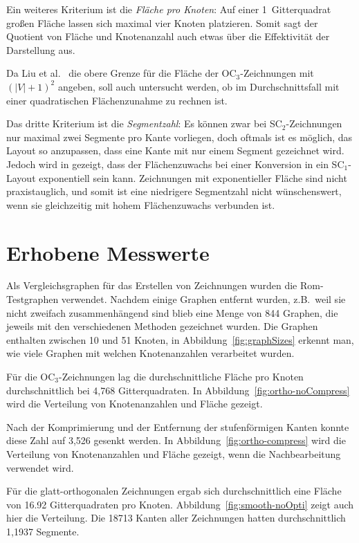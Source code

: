\documentclass[a4paper]{scrreprt}
\theoremstyle{definition}
\begin{document}
Ein weiteres Kriterium ist die \emph{Fläche pro Knoten}: Auf einer 1~Gitterquadrat großen Fläche lassen sich maximal vier Knoten platzieren. Somit sagt der Quotient von Fläche und Knotenanzahl auch etwas über die Effektivität der Darstellung aus.

Da Liu et al.~\cite{liu+etal-98} die obere Grenze für die Fläche der OC$_3$-Zeichnungen mit $(|V|+1)^2$ angeben, soll auch untersucht werden, ob im Durchschnittsfall mit einer quadratischen Flächenzunahme zu rechnen ist.

Das dritte Kriterium ist die \emph{Segmentzahl}: Es können zwar bei SC$_2$-Zeichnungen nur maximal zwei Segmente pro Kante vorliegen, doch oftmals ist es möglich, das Layout so anzupassen, dass eine Kante mit nur einem Segment gezeichnet wird.  Jedoch wird in \cite{bekos-13} gezeigt, dass der Flächenzuwachs bei einer Konversion in ein SC$_1$-Layout exponentiell sein kann. Zeichnungen mit exponentieller Fläche sind nicht praxistauglich, und somit ist eine niedrigere Segmentzahl nicht wünschenswert, wenn sie gleichzeitig mit hohem Flächenzuwachs verbunden ist.

\section{Erhobene Messwerte}

Als Vergleichsgraphen für das Erstellen von Zeichnungen wurden die Rom-Testgraphen verwendet. Nachdem einige Graphen entfernt wurden, z.B.\ weil sie nicht zweifach zusammenhängend sind blieb eine Menge von 844 Graphen, die jeweils mit den verschiedenen Methoden gezeichnet wurden. Die Graphen enthalten zwischen 10 und 51 Knoten, in Abbildung~\ref{fig:graphSizes} erkennt man, wie viele Graphen mit welchen Knotenanzahlen verarbeitet wurden. %

Für die OC$_3$-Zeichnungen lag die durchschnittliche Fläche pro Knoten durchschnittlich bei 4,768 Gitterquadraten. In Abbildung~\ref{fig:ortho-noCompress} wird die Verteilung von Knotenanzahlen und Fläche gezeigt.

Nach der Komprimierung und der Entfernung der stufenförmigen Kanten konnte diese Zahl auf 3,526 gesenkt werden. In Abbildung~\ref{fig:ortho-compress} wird die Verteilung von Knotenanzahlen und Fläche gezeigt, wenn die Nachbearbeitung verwendet wird.

Für die glatt-orthogonalen Zeichnungen ergab sich durchschnittlich eine Fläche von 16.92 Gitterquadraten pro Knoten. Abbildung~\ref{fig:smooth-noOpti} zeigt auch hier die Verteilung. Die 18713 Kanten aller Zeichnungen hatten durchschnittlich 1,1937 Segmente.
\end{document}
